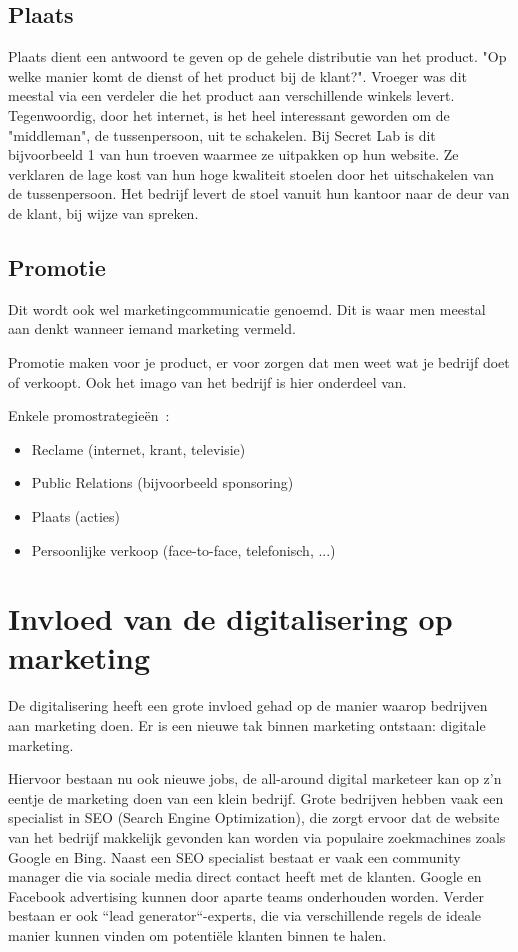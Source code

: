 \subsection{Plaats} \label{sec:marketing-plaats}
Plaats dient een antwoord te geven op de gehele distributie van het product. "Op welke manier komt de dienst of het product bij de klant?". Vroeger was dit meestal via een verdeler die het product aan verschillende winkels levert. Tegenwoordig, door het internet, is het heel interessant geworden om de "middleman", de tussenpersoon, uit te schakelen. Bij Secret Lab is dit bijvoorbeeld 1 van hun troeven waarmee ze uitpakken op hun website. Ze verklaren de lage kost van hun hoge kwaliteit stoelen door het uitschakelen van de tussenpersoon. Het bedrijf levert de stoel vanuit hun kantoor naar de deur van de klant, bij wijze van spreken. 

\subsection{Promotie} \label{sec:marketing-promotie}
Dit wordt ook wel marketingcommunicatie genoemd. Dit is waar men meestal aan denkt wanneer iemand marketing vermeld.

Promotie maken voor je product, er voor zorgen dat men weet wat je bedrijf doet of verkoopt. Ook het imago van het bedrijf is hier onderdeel van.

Enkele promostrategieën~\autocite{marketingscriptie.nl2018}:
\begin{itemize}
	\item Reclame (internet, krant, televisie)
	\item Public Relations (bijvoorbeeld sponsoring)
	\item Plaats (acties)
	\item Persoonlijke verkoop (face-to-face, telefonisch, ...)
\end{itemize}

\section{Invloed van de digitalisering op marketing} \label{sec:digitalisering-marketing}
De digitalisering heeft een grote invloed gehad op de manier waarop bedrijven aan marketing doen. Er is een nieuwe tak binnen marketing ontstaan: digitale marketing. 

Hiervoor bestaan nu ook nieuwe jobs, de all-around digital marketeer kan op z'n eentje de marketing doen van een klein bedrijf. Grote bedrijven hebben vaak een specialist in SEO (Search Engine Optimization), die zorgt ervoor dat de website van het bedrijf makkelijk gevonden kan worden via populaire zoekmachines zoals Google en Bing. Naast een SEO specialist bestaat er vaak een community manager die via sociale media direct contact heeft met de klanten. Google en Facebook advertising kunnen door aparte teams onderhouden worden. Verder bestaan er ook ``lead generator``-experts, die via verschillende regels de ideale manier kunnen vinden om potentiële klanten binnen te halen.

